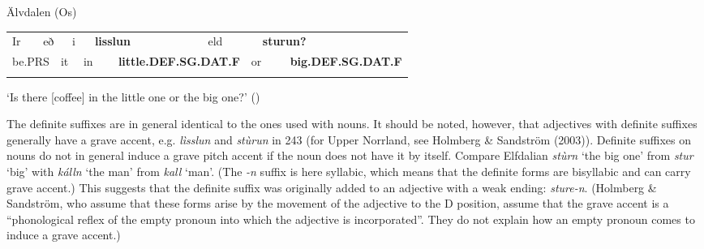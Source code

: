 \begin{listWWNumileveli}
\item 

\begin{styleExample}
\label{bkm:Ref78439135}Älvdalen (Os)

\end{styleExample}

\end{listWWNumileveli}

\begin{tabular}{llllllllllll}
\lsptoprule
Ir & \multicolumn{2}{l}{eð

} & \multicolumn{2}{l}{i

} & \multicolumn{2}{l}{{\bfseries lisslun}

} & \multicolumn{2}{l}{eld

} & \multicolumn{2}{l}{{\bfseries sturun?}

} & \\
\multicolumn{2}{l}{be.PRS

} & \multicolumn{2}{l}{it

} & \multicolumn{2}{l}{in

} & \multicolumn{2}{l}{{\bfseries little.DEF.SG.DAT.F}

} & \multicolumn{2}{l}{or

} & \multicolumn{2}{l}{{\bfseries big.DEF.SG.DAT.F}

}\\
\lspbottomrule
\end{tabular}

\begin{styleTranslation}
‘Is there [coffee] in the little one or the big one?’ (\citet[53]{Levander1909})

\end{styleTranslation}

\begin{styleBodyTextFirst}
The definite suffixes are in general identical to the ones used with nouns. It should be noted, however, that adjectives with definite suffixes generally have a grave accent, e.g. \textit{lìsslun} and \textit{stùrun} in 243 (for Upper Norrland, see Holmberg \& Sandström (2003)). Definite suffixes on nouns do not in general induce a grave pitch accent if the noun does not have it by itself. Compare Elfdalian \textit{stùrn} ‘the big one’ from \textit{stur} ‘big’ with \textit{kálln} ‘the man’ from \textit{kall} ‘man’. (The\textit{ -}\textit{n} suffix is here syllabic, which means that the definite forms are bisyllabic and can carry grave accent.) This suggests that the definite suffix was originally added to an adjective with a weak ending: \textit{sture-n}. (Holmberg \& Sandström, who assume that these forms arise by the movement of the adjective to the D position, assume that the grave accent is a “phonological reflex of the empty pronoun into which the adjective is incorporated”. They do not explain how an empty pronoun comes to induce a grave accent.) 

\end{styleBodyTextFirst}

